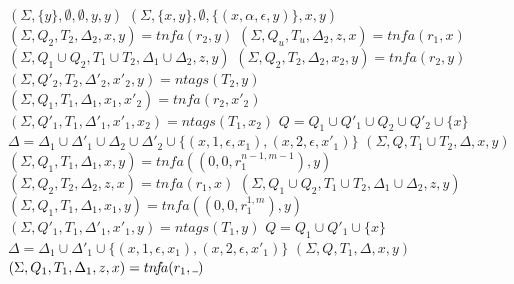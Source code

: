 \documentclass[AMA,STIX1COL]{WileyNJD-v2}
\newcommand{\Xund}{\rule{.4em}{.4pt}}
\begin{document}
\begin{algorithm}[] \DontPrintSemicolon {} \label{alg_tnfa}
\begin{multicols}{2}

    \newcommand \retonfa {tn\!f\!a}
    \newcommand \ntag {ntags}

    \Fn {$\underline{\retonfa(r, y)} \smallskip$} {
         {
            \Return $(\Sigma, \{y\}, \emptyset, \emptyset, y, y)$
        }
        \BlankLine
         {
            \Return $(\Sigma, \{x,y\}, \emptyset, \{(x, \alpha, \epsilon, y)\}, x, y)$
        }
        \BlankLine
         {
            $(\Sigma, Q_2, T_2, \Delta_2, x, y) = \retonfa (r_2, y)$ \;
            $(\Sigma, Q_u, T_u, \Delta_2, z, x) = \retonfa (r_1, x)$ \;
            \Return $(\Sigma, Q_1 \cup Q_2, T_1 \cup T_2, \Delta_1 \cup \Delta_2, z, y)$
        }
        \BlankLine
         {
            $(\Sigma, Q_2, T_2, \Delta_2, x_2, y) = \retonfa (r_2, y)$ \;
            $(\Sigma, Q'_2, T_2, \Delta'_2, x'_2, y) = \ntag (T_2, y)$ \;
            $(\Sigma, Q_1, T_1, \Delta_1, x_1, x'_2) = \retonfa (r_2, x'_2)$ \;
            $(\Sigma, Q'_1, T_1, \Delta'_1, x'_1, x_2) = \ntag (T_1, x_2)$ \;
            $Q = Q_1 \cup Q'_1 \cup Q_2 \cup Q'_2 \cup \{x\}$ \;
            $\Delta = \Delta_1 \cup \Delta'_1 \cup \Delta_2 \cup \Delta'_2 \cup \big\{ (x,1,\epsilon,x_1), (x,2,\epsilon,x'_1) \big\}$ \;
            \Return $(\Sigma, Q, T_1 \cup T_2, \Delta, x, y)$
        }
        \BlankLine
         {
            $(\Sigma, Q_1, T_1, \Delta_1, x, y) = \retonfa ((0, 0, r_1^{n-1,m-1}), y)$ \;
            $(\Sigma, Q_2, T_2, \Delta_2, z, x) = \retonfa (r_1, x)$ \;
            \Return $(\Sigma, Q_1 \cup Q_2, T_1 \cup T_2, \Delta_1 \cup \Delta_2, z, y)$
        }
        \BlankLine
         {
            $(\Sigma, Q_1, T_1, \Delta_1, x_1, y) = \retonfa ((0, 0, r_1^{1,m}), y)$ \;
            $(\Sigma, Q'_1, T_1, \Delta'_1, x'_1, y) = \ntag (T_1, y)$ \;
            $Q = Q_1 \cup Q'_1 \cup \{x\}$ \;
            $\Delta = \Delta_1 \cup \Delta'_1 \cup \big\{ (x, 1, \epsilon, x_1), (x, 2, \epsilon, x'_1) \big\}$ \;
            \Return $(\Sigma, Q, T_1, \Delta, x, y)$
        }
        \BlankLine
         {
            $(\Sigma, Q_1, T_1, \Delta_1, z, x) = \retonfa (r_1, \Xund)$ \;
}}
\end{multicols}
\end{algorithm}
\end{document}
